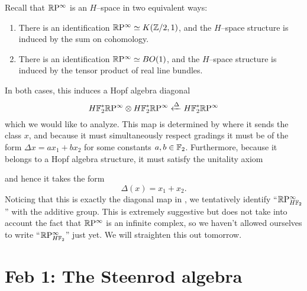 \begin{example}\label{RPExampleFaulty}
Recall that $\mathbb R\mathrm P^\infty$ is an $H$--space in two equivalent ways:
\begin{enumerate}
\item There is an identification $\mathbb R\mathrm P^\infty \simeq K(\mathbb Z/2, 1)$, and the $H$--space structure is induced by the sum on cohomology.
\item There is an identification $\mathbb R\mathrm P^\infty \simeq BO(1)$, and the $H$--space structure is induced by the tensor product of real line bundles.
\end{enumerate}
In both cases, this induces a Hopf algebra diagonal \[H\mathbb F_2^* \mathbb R\mathrm P^\infty \otimes H\mathbb F_2^* \mathbb R\mathrm P^\infty \xleftarrow\Delta H\mathbb F_2^* \mathbb R\mathrm P^\infty\] which we would like to analyze.  This map is determined by where it sends the class $x$, and because it must simultaneously respect gradings it must be of the form $\Delta x = ax_1 + bx_2$ for some constants $a, b \in \mathbb F_2$.  Furthermore, because it belongs to a Hopf algebra structure, it must satisfy the unitality axiom
\begin{center}
\end{center}
and hence it takes the form \[\Delta(x) = x_1 + x_2.\]  Noticing that this is exactly the diagonal map in , we tentatively identify ``$\mathbb R\mathrm P^\infty_{H\mathbb F_2}$'' with the additive group.  This is extremely suggestive but does not take into account the fact that $\mathbb R\mathrm P^\infty$ is an infinite complex, so we haven't allowed ourselves to write ``$\mathbb R\mathrm P^\infty_{H\mathbb F_2}$'' just yet.  We will straighten this out tomorrow.
\end{example}








\section{Feb 1: The Steenrod algebra}



